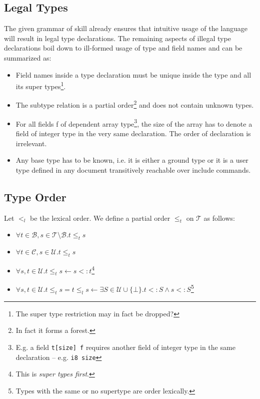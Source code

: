 \subsection{Legal Types}

The given grammar of \gls{skill} already ensures that intuitive usage of the language will result in legal type declarations. The remaining aspects of illegal type declarations boil down to ill-formed usage of type and field names and can be summarized as:
\begin{itemize}
 \item Field names inside a type declaration must be unique inside the type and all its super types\footnote{The super type restriction may in fact be dropped?}.
 
 \item The subtype relation is a partial order\footnote{In fact it forms a forest.} and does not contain unknown types.

 \item For all fields f of dependent array type\footnote{E.g. a field \texttt{t[size] f} requires another field of integer type in the same declaration -- e.g. \texttt{i8 size}}, the size of the array has to denote a field of integer type in the very same declaration. The order of declaration is irrelevant.
 
 \item Any base type has to be known, i.e. it is either a ground type or it is a user type defined in any document transitively reachable over include commands.
\end{itemize}


\subsection{Type Order}

Let $<_l$ be the lexical order. We define a partial order $\leq_t$ on $\mathcal{T}$ as follows:
\begin{itemize}
 \item $\forall t \in \mathcal{B}, s \in \mathcal{T}\setminus\mathcal{B}. t \leq_t s$
 \item $\forall t \in \mathcal{C}, s \in \mathcal{U}. t \leq_t s$
 \item $\forall s,t \in \mathcal{U}. t \leq_t s \leftarrow s <: t $\footnote{This is \textit{super types first}.}
 \item $\forall s,t \in \mathcal{U}. t \leq_t s = t \leq_l s\leftarrow \exists S \in \mathcal{U} \cup \{\bot\}. t <: S \wedge s <: S $\footnote{Types with the same or no supertype are order lexically.}
\end{itemize}

